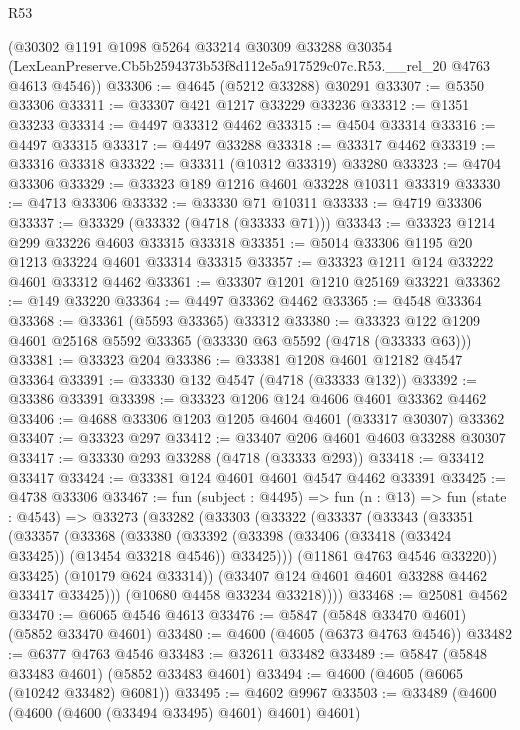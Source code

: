 \begin{lexlean}{R53}
\begin{coremodule}
    (@30302
      @1191
      @1098
      @5264
      @33214
      @30309
      @33288
      @30354
      (LexLeanPreserve.Cb5b2594373b53f8d112e5a917529c07c.R53.__rel_20 @4763 @4613 @4546))
@33306 := @4645 (@5212 @33288) @30291
@33307 := @5350 @33306
@33311 := @33307 @421 @1217 @33229 @33236
@33312 := @1351 @33233
@33314 := @4497 @33312 @4462
@33315 := @4504 @33314
@33316 := @4497 @33315
@33317 := @4497 @33288
@33318 := @33317 @4462
@33319 := @33316 @33318
@33322 := @33311 (@10312 @33319) @33280
@33323 := @4704 @33306
@33329 := @33323 @189 @1216 @4601 @33228 @10311 @33319
@33330 := @4713 @33306
@33332 := @33330 @71 @10311
@33333 := @4719 @33306
@33337 := @33329 (@33332 (@4718 (@33333 @71)))
@33343 := @33323 @1214 @299 @33226 @4603 @33315 @33318
@33351 := @5014 @33306 @1195 @20 @1213 @33224 @4601 @33314 @33315
@33357 := @33323 @1211 @124 @33222 @4601 @33312 @4462
@33361 := @33307 @1201 @1210 @25169 @33221
@33362 := @149 @33220
@33364 := @4497 @33362 @4462
@33365 := @4548 @33364
@33368 := @33361 (@5593 @33365) @33312
@33380 := @33323 @122 @1209 @4601 @25168 @5592 @33365 (@33330 @63 @5592 (@4718 (@33333 @63)))
@33381 := @33323 @204
@33386 := @33381 @1208 @4601 @12182 @4547 @33364
@33391 := @33330 @132 @4547 (@4718 (@33333 @132))
@33392 := @33386 @33391
@33398 := @33323 @1206 @124 @4606 @4601 @33362 @4462
@33406 := @4688 @33306 @1203 @1205 @4604 @4601 (@33317 @30307) @33362
@33407 := @33323 @297
@33412 := @33407 @206 @4601 @4603 @33288 @30307
@33417 := @33330 @293 @33288 (@4718 (@33333 @293))
@33418 := @33412 @33417
@33424 := @33381 @124 @4601 @4601 @4547 @4462 @33391
@33425 := @4738 @33306
@33467 := fun (subject : @4495) =>
  fun (n : @13) =>
  fun (state : @4543) =>
  @33273
    (@33282
      (@33303
        (@33322
          (@33337
            (@33343
              (@33351
                (@33357
                  (@33368
                    (@33380
                      (@33392
                        (@33398 (@33406 (@33418 (@33424 @33425)) (@13454 @33218 @4546)) @33425)))
                    (@11861 @4763 @4546 @33220))
                  @33425)
                (@10179 @624 @33314))
              (@33407 @124 @4601 @4601 @33288 @4462 @33417 @33425)))
          (@10680 @4458 @33234 @33218))))
@33468 := @25081 @4562
@33470 := @6065 @4546 @4613
@33476 := @5847 (@5848 @33470 @4601) (@5852 @33470 @4601)
@33480 := @4600 (@4605 (@6373 @4763 @4546))
@33482 := @6377 @4763 @4546
@33483 := @32611 @33482
@33489 := @5847 (@5848 @33483 @4601) (@5852 @33483 @4601)
@33494 := @4600 (@4605 (@6065 (@10242 @33482) @6081))
@33495 := @4602 @9967
@33503 := @33489 (@4600 (@4600 (@4600 (@33494 @33495) @4601) @4601) @4601)

\end{coremodule}
\end{lexlean}
